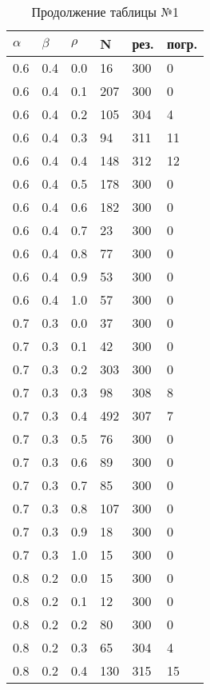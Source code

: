 \begin{table}[!htb]
	\begin{minipage}{.45\linewidth}
		\caption*{Продолжение таблицы №1\newline}
		\centering
		\begin{tabular}{||p{}p{}p{}p{}p{}p{}||}
			\hline
			$\alpha$ & $\beta$ & $\rho$ & N & рез. & погр. \\ \hline\hline
			0.6 & 0.4 & 0.0 & 16 & 300 & 0 \\ 
			0.6 & 0.4 & 0.1 & 207 & 300 & 0 \\ 
			0.6 & 0.4 & 0.2 & 105 & 304 & 4 \\ 
			0.6 & 0.4 & 0.3 & 94 & 311 & 11 \\ 
			0.6 & 0.4 & 0.4 & 148 & 312 & 12 \\ 
			0.6 & 0.4 & 0.5 & 178 & 300 & 0 \\ 
			0.6 & 0.4 & 0.6 & 182 & 300 & 0 \\ 
			0.6 & 0.4 & 0.7 & 23 & 300 & 0 \\ 
			0.6 & 0.4 & 0.8 & 77 & 300 & 0 \\ 
			0.6 & 0.4 & 0.9 & 53 & 300 & 0 \\ 
			0.6 & 0.4 & 1.0 & 57 & 300 & 0  \\ \hline
			0.7 & 0.3 & 0.0 & 37 & 300 & 0 \\ 
			0.7 & 0.3 & 0.1 & 42 & 300 & 0 \\ 
			0.7 & 0.3 & 0.2 & 303 & 300 & 0 \\ 
			0.7 & 0.3 & 0.3 & 98 & 308 & 8 \\ 
			0.7 & 0.3 & 0.4 & 492 & 307 & 7 \\ 
			0.7 & 0.3 & 0.5 & 76 & 300 & 0 \\ 
			0.7 & 0.3 & 0.6 & 89 & 300 & 0 \\ 
			0.7 & 0.3 & 0.7 & 85 & 300 & 0 \\ 
			0.7 & 0.3 & 0.8 & 107 & 300 & 0 \\ 
			0.7 & 0.3 & 0.9 & 18 & 300 & 0 \\ 
			0.7 & 0.3 & 1.0 & 15 & 300 & 0  \\ \hline
			0.8 & 0.2 & 0.0 & 15 & 300 & 0 \\ 
			0.8 & 0.2 & 0.1 & 12 & 300 & 0 \\ 
			0.8 & 0.2 & 0.2 & 80 & 300 & 0 \\ 
			0.8 & 0.2 & 0.3 & 65 & 304 & 4 \\ 
			0.8 & 0.2 & 0.4 & 130 & 315 & 15 \\ 

\end{tabular}
\end{minipage}
\end{table}
